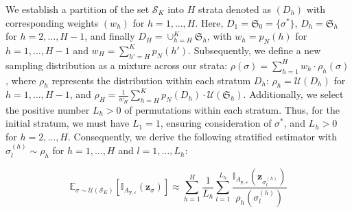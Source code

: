 \documentclass[lineno]{biometrika}
\def\Clust{K}
\def\iperm{l}
\def\istrat{h}
\def\Npermstrat#1{L_{#1}}
\def\Nstrat{H}
\def\obsdata{\mathbf{y}}
\def\simdata{\mathbf{z}}
\begin{document}
We establish a partition of the set $\mathcal S_K$ into $H$ strata denoted as $(D_h)$ with corresponding weights $(w_h)$ for $h=1,\dots,H$. Here, $D_1 = \mathfrak S_0 = \{ \sigma^* \}$, $D_h = \mathfrak S_h$ for $h = 2,\dots,H-1$, and finally $D_H = \cup_{h=H}^K \mathfrak S_h$, with $w_h = p_N(h)$ for $h=1,\dots,H-1$ and $w_H = \sum_{h'=H}^K p_N(h')$. Subsequently, we define a new sampling distribution as a mixture across our strata: $\rho(\sigma)= \sum_{h=1}^H w_h \cdot \rho_h(\sigma)$, where $\rho_h$ represents the distribution within each stratum $D_h$: $\rho_h = \mathcal U(D_h)$ for $h=1,\dots,H-1$, and $\rho_H = \frac{1}{w_H}\sum_{h=H}^K p_N(D_h)\cdot \mathcal U(\mathfrak S_h)$. Additionally, we select the positive number $\Npermstrat{h}>0$ of permutations within each stratum. Thus, for the initial stratum, we must have $\Npermstrat{1} = 1$, ensuring consideration of $\sigma^*$, and $\Npermstrat{h}>0$ for $h=2,\dots,H$. Consequently, we derive the following stratified estimator with $\sigma_{\iperm}^{(h)} \sim \rho_h$ for $h=1,\dots,H$ and $\iperm=1,\dots,\Npermstrat{h}$:

$$\mathbb E_{\sigma \sim \mathcal U(\mathcal S_K)} \left [ \mathbb I_{A_{\obsdata,\varepsilon}}(\simdata_{\sigma}) \right] \approx \sum_{h=1}^H \frac{1}{\Npermstrat{h}} \sum_{l=1}^{\Npermstrat{h}}\frac { \mathbb I_{A_{\obsdata,\varepsilon}}(\simdata_{\sigma_l^{(h)}})}{\rho_h(\sigma_l^{(h)})} $$






\end{document}
